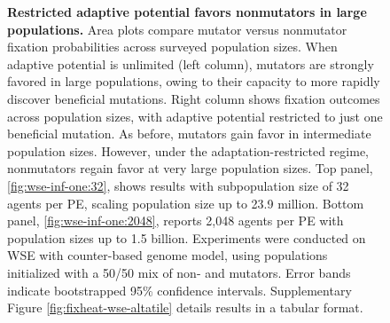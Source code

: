 \begin{figure}[h]
\begin{minipage}{0.7\textwidth}
  \end{minipage}%
  \begin{minipage}{0.3\textwidth}
    \caption{%
      \textbf{Restricted adaptive potential favors nonmutators in large populations.}
      \footnotesize
      Area plots compare mutator versus nonmutator fixation probabilities across surveyed population sizes.
      When adaptive potential is unlimited (left column), mutators are strongly favored in large populations, owing to their capacity to more rapidly discover beneficial mutations.
      Right column shows fixation outcomes across population sizes, with adaptive potential restricted to just one beneficial mutation.
      As before, mutators gain favor in intermediate population sizes.
      However, under the adaptation-restricted regime, nonmutators regain favor at very large population sizes.
      Top panel, \ref{fig:wse-inf-one:32}, shows results with subpopulation size of 32 agents per PE, scaling population size up to 23.9 million.
      Bottom panel, \ref{fig:wse-inf-one:2048}, reports 2,048 agents per PE with population sizes up to 1.5 billion.
      Experiments were conducted on WSE with counter-based genome model, using populations initialized with a 50/50 mix of non- and mutators.
      Error bands indicate bootstrapped 95\% confidence intervals.
      Supplementary Figure \ref{fig:fixheat-wse-altatile} details results in a tabular format.
    }
    \label{fig:wse-inf-one}
  \end{minipage}
\end{figure}
